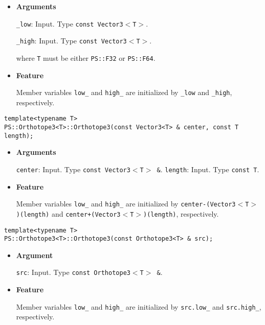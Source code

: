 \begin{itemize}

\item{{\bf Arguments}}

\texttt{\_low}: Input. Type \texttt{const Vector3$<$T$>$}.

\texttt{\_high}: Input. Type \texttt{const Vector3$<$T$>$}.

where \texttt{T} must be either \texttt{PS::F32} or \texttt{PS::F64}.

\item{{\bf Feature}}

Member variables \texttt{low\_} and \texttt{high\_} are initialized by \texttt{\_low} and \texttt{\_high}, respectively.

\end{itemize}
\begin{screen}
\begin{verbatim}
template<typename T>
PS::Orthotope3<T>::Orthotope3(const Vector3<T> & center, const T length);
\end{verbatim}
\end{screen}

\begin{itemize}

\item{{\bf Arguments}}

\texttt{center}: Input. Type \texttt{const Vector3$<$T$>$ \&}.
\texttt{length}: Input. Type \texttt{const T}.

\item{{\bf Feature}}

Member variables \texttt{low\_} and \texttt{high\_} are initialized by \texttt{center-(Vector3$<$T$>$)(length)} and \texttt{center+(Vector3$<$T$>$)(length)}, respectively.

\end{itemize}


\begin{screen}
\begin{verbatim}
template<typename T>
PS::Orthotope3<T>::Orthotope3(const Orthotope3<T> & src);
\end{verbatim}
\end{screen}

\begin{itemize}

\item{{\bf Argument}}

\texttt{src}: Input. Type \texttt{const Orthotope3$<$T$>$ \&}.

\item{{\bf Feature}}

Member variables \texttt{low\_} and \texttt{high\_} are initialized by \texttt{src.low\_} and \texttt{src.high\_}, respectively.

\end{itemize}


